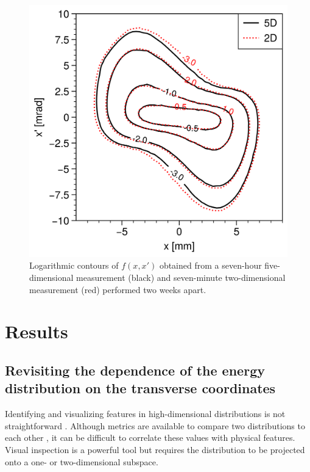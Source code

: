 \documentclass[%
 reprint,
nofootinbib,
 amsmath,amssymb,
 aps,
prstab,
]{revtex4-2}
\begin{document}
\begin{figure}[]
    \centering
    \includegraphics[width=0.73\columnwidth]{fig_5D_vs_2D.png}
    \caption{Logarithmic contours of $f(x, x')$ obtained from a seven-hour five-dimensional measurement (black) and seven-minute two-dimensional measurement (red) performed two weeks apart.}
    \label{fig:5D_vs_2D}
\end{figure}
%
 

\section{Results}\label{sec:results}

\subsection{Revisiting the dependence of the energy distribution on the transverse coordinates}\label{sec:results-a}

Identifying and visualizing features in high-dimensional distributions is not straightforward \cite{Liu2017}. Although metrics are available to compare two distributions to each other \cite{Loudin2003, Modarres2020, Wong2022-symmetry, Wong2022-tomography, Mitchell2022}, it can be difficult to correlate these values with physical features. Visual inspection is a powerful tool but requires the distribution to be projected onto a one- or two-dimensional subspace.
\end{document}
